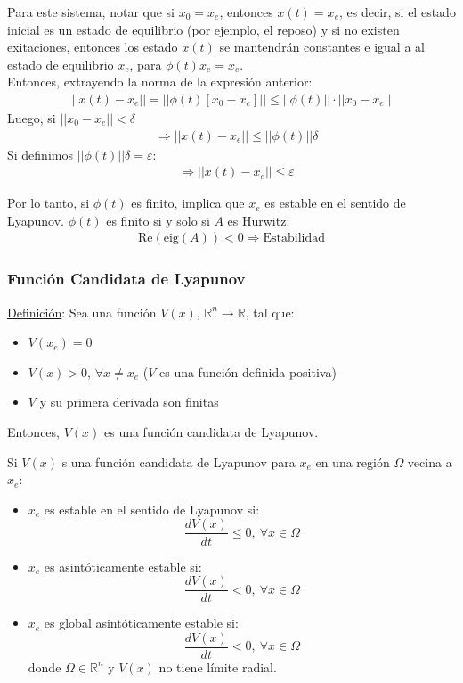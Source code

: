 Para este sistema, notar que si $x_0 = x_e$, entonces $x(t)=x_e$, es decir, si el estado inicial es un estado de equilibrio (por ejemplo, el reposo) y si no existen exitaciones, entonces los estado $x(t)$  se mantendrán constantes e igual a al estado de equilibrio $x_e$, para $\phi(t)x_e=x_e$.\\

Entonces, extrayendo la norma de la expresión anterior:
\begin{align*}
    ||x(t)-x_e||=||\phi(t)[x_0-x_e]||\leq||\phi(t)||\cdot||x_0-x_e||
\end{align*}
Luego, si $||x_0 - x_e||<\delta$
\begin{align*}
    &\Longrightarrow ||x(t)-x_e||\leq ||\phi(t)|| \delta
\end{align*}
Si definimos $||\phi(t)||\delta = \varepsilon$:
\begin{align*}
    &\Longrightarrow ||x(t) - x_e|| \leq \varepsilon
\end{align*}

Por lo tanto, si $\phi(t)$ es finito, implica que $x_e$ es estable en el sentido de Lyapunov. 
$\phi(t)$ es finito si y solo si $A$ es Hurwitz:
\begin{align*}
    \text{Re}\left(\text{eig}(A)\right)<0\Longrightarrow \text{Estabilidad}
\end{align*}

\subsubsection{Función Candidata de Lyapunov}
\underline{Definición}: Sea una función $V(x)$, $\mathbb{R}^n\to \mathbb{R}$, tal que: 
\begin{itemize}
    \item $V(x_e)=0$
    \item $V(x)>0$, $\forall x\neq x_e$ ($V$ es una función definida positiva)
    \item $V$ y su primera derivada son finitas
\end{itemize}

Entonces, $V(x)$ es una función candidata de Lyapunov.\\

\begin{theorem}
    Si $V(x)$ s una función candidata de Lyapunov para $x_e$ en una región $\Omega$ vecina a $x_e$:
\begin{itemize}
    \item[a)] $x_e$ es estable en el sentido de Lyapunov si:
    $$\frac{dV(x)}{dt}\leq 0, ~\forall x\in \Omega $$
    \item[b)] $x_e$ es asintóticamente estable si:
    $$\frac{dV(x)}{dt}< 0, ~\forall x\in \Omega$$
    \item[c)] $x_e$ es global asintóticamente estable si:
    $$\frac{dV(x)}{dt}< 0, ~\forall x\in \Omega$$
    donde $\Omega \in \mathbb{R}^n$ y $V(x)$ no tiene límite radial.
\end{itemize}
\end{theorem}

